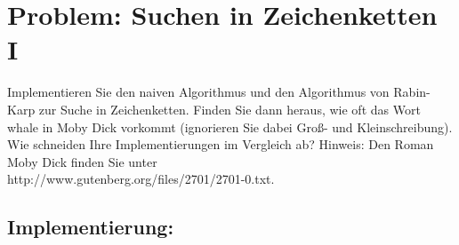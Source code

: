 \section{Problem: Suchen in Zeichenketten I}

Implementieren Sie den naiven Algorithmus und den Algorithmus von Rabin-Karp
zur Suche in Zeichenketten. Finden Sie dann heraus, wie oft das Wort whale in Moby
Dick vorkommt (ignorieren Sie dabei Groß- und Kleinschreibung). Wie schneiden
Ihre Implementierungen im Vergleich ab?
Hinweis: Den Roman Moby Dick finden Sie unter\\
http://www.gutenberg.org/files/2701/2701-0.txt.

\subsection{Implementierung:}
